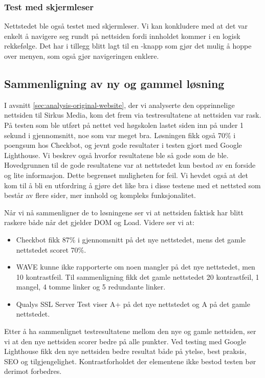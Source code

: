 \subsubsection{Test med skjermleser}
Nettstedet ble også testet med skjermleser. Vi kan konkludere med at det var enkelt å navigere seg rundt på nettsiden fordi innholdet kommer i en logisk rekkefølge. Det har i tillegg blitt lagt til en -knapp som gjør det mulig å hoppe over menyen, som også gjør navigeringen enklere.

\subsection{Sammenligning av ny og gammel løsning}
I avsnitt \ref{sec:analysis-original-website}, der vi analyserte den opprinnelige nettsiden til Sirkus Media, kom det frem via testresultatene at nettsiden var rask. På testen som ble utført på nettet ved høgskolen lastet siden inn på under 1 sekund i gjennomsnitt, noe som var meget bra. Løsningen fikk også 70\% i poengsum hos Checkbot, og jevnt gode resultater i testen gjort med Google Lighthouse. Vi beskrev også hvorfor resultatene ble så gode som de ble. Hovedgrunnen til de gode resultatene var at nettstedet kun bestod av en forside og lite informasjon. Dette begrenset muligheten for feil. Vi hevdet også at det kom til å bli en utfordring å gjøre det like bra i disse testene med et nettsted som består av flere sider, mer innhold og kompleks funksjonalitet.

Når vi nå sammenligner de to løsningene ser vi at nettsiden faktisk har blitt raskere både når det gjelder DOM og Load. Videre ser vi at:

\begin{itemize}
    \item Checkbot fikk 87\% i gjennomsnitt på det nye nettstedet, mens det gamle nettstedet scoret 70\%. 
    \item WAVE kunne ikke rapporterte om noen mangler på det nye nettstedet, men 10 kontrastfeil. Til sammenligning fikk det gamle nettstedet 20 kontrastfeil, 1 mangel, 4 tomme linker og 5 redundante linker.
    \item Qualys SSL Server Test viser A+ på det nye nettstedet og A på det gamle nettstedet.
\end{itemize}

Etter å ha sammenlignet testresultatene mellom den nye og gamle nettsiden, ser vi at den nye nettsiden scorer bedre på alle punkter. Ved testing med Google Lighthouse fikk den nye nettsiden bedre resultat både på ytelse, best praksis, SEO og tilgjengelighet. Kontrastforholdet der elementene ikke bestod testen bør derimot forbedres.

